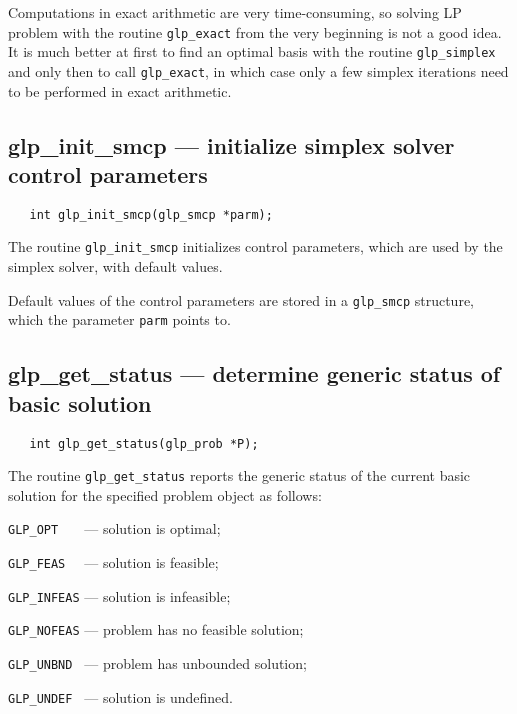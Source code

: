Computations in exact arithmetic are very time-consuming, so solving
LP problem with the routine \verb|glp_exact| from the very beginning is
not a good idea. It is much better at first to find an optimal basis
with the routine \verb|glp_simplex| and only then to call
\verb|glp_exact|, in which case only a few simplex iterations need to
be performed in exact arithmetic.

\newpage

\subsection{glp\_init\_smcp --- initialize simplex solver control
parameters}

\synopsis

\begin{verbatim}
   int glp_init_smcp(glp_smcp *parm);
\end{verbatim}

\description

The routine \verb|glp_init_smcp| initializes control parameters, which
are used by the simplex solver, with default values.

Default values of the control parameters are stored in
a \verb|glp_smcp| structure, which the parameter \verb|parm| points to.

\subsection{glp\_get\_status --- determine generic status of basic
solution}

\synopsis

\begin{verbatim}
   int glp_get_status(glp_prob *P);
\end{verbatim}

\returns

The routine \verb|glp_get_status| reports the generic status of the
current basic solution for the specified problem object as follows:

\verb|GLP_OPT   | --- solution is optimal;

\verb|GLP_FEAS  | --- solution is feasible;

\verb|GLP_INFEAS| --- solution is infeasible;

\verb|GLP_NOFEAS| --- problem has no feasible solution;

\verb|GLP_UNBND | --- problem has unbounded solution;

\verb|GLP_UNDEF | --- solution is undefined.

